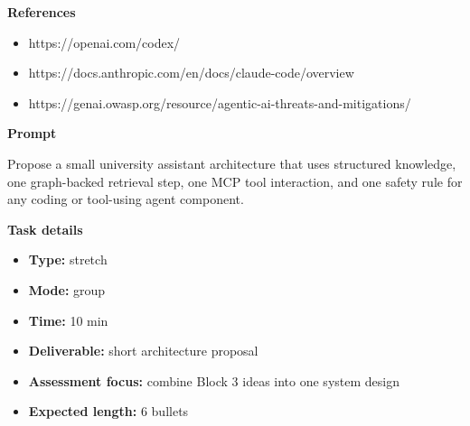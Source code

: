 \documentclass[11pt]{article}
\begin{document}
\begin{tcolorbox}[colback=white,colframe=MidnightBlue,title={Q7 Coding-Agent Safety Review},fonttitle=\bfseries,breakable]
{\large\bfseries\color{MidnightBlue} References}\par\medskip
\begin{itemize}\item https://openai.com/codex/
\item https://docs.anthropic.com/en/docs/claude-code/overview
\item https://genai.owasp.org/resource/agentic-ai-threats-and-mitigations/\end{itemize}
\end{tcolorbox}

\begin{tcolorbox}[colback=white,colframe=MidnightBlue,title={Q8 Stretch Synthesis},fonttitle=\bfseries,breakable]
\begin{center}
\end{center}

{\large\bfseries\color{MidnightBlue} Prompt}\par\medskip
Propose a small university assistant architecture that uses structured knowledge, one graph-backed retrieval step, one MCP tool interaction, and one safety rule for any coding or tool-using agent component.

{\large\bfseries\color{MidnightBlue} Task details}\par\medskip
\begin{itemize}\item \textbf{Type:} stretch
\item \textbf{Mode:} group
\item \textbf{Time:} 10 min
\item \textbf{Deliverable:} short architecture proposal
\item \textbf{Assessment focus:} combine Block 3 ideas into one system design
\item \textbf{Expected length:} 6 bullets\end{itemize}


\end{tcolorbox}
\end{document}
